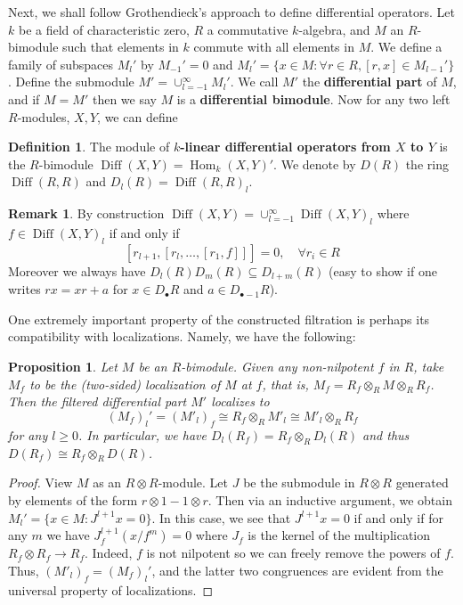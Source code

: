 \documentclass[11pt, a4paper]{article}
\newtheorem{proposition}[theorem]{Proposition}
\theoremstyle{definition}
\newtheorem{remark}[theorem]{Remark}
\newtheorem{definition}[theorem]{Definition}
\newcommand{\Hom}[0]{\operatorname{Hom}}
\newcommand{\Diff}{\operatorname{Diff}}
\begin{document}
    Next, we shall follow Grothendieck's approach to define differential operators. Let $k$ be a field of characteristic zero, $R$ a commutative $k$-algebra, and $M$ an $R$-bimodule such that elements in $k$ commute with all elements in $M$. We define a family of subspaces $M_l'$ by $M_{-1}'=0$ and $M_l'=\{x\in M: \forall r\in R, [r, x]\in M_{l-1}'\}$. Define the submodule $M'=\cup_{l=-1}^\infty M_l'$. We call $M'$ the \textbf{differential part} of $M$, and if $M=M'$ then we say $M$ is a \textbf{differential bimodule}. Now for any two left $R$-modules, $X, Y$, we can define
    \begin{definition}
        The module of \textbf{$k$-linear differential operators from $X$ to $Y$} is the $R$-bimodule $\Diff(X, Y)=\Hom_k(X, Y)'$. We denote by $D(R)$ the ring $\Diff(R, R)$ and $D_l(R)=\Diff(R, R)_l$.
    \end{definition}
    \begin{remark}
        By construction $\Diff(X, Y)=\cup_{l=-1}^\infty\Diff(X, Y)_l$ where $f\in\Diff(X, Y)_l$ if and only if 
        \[[r_{l+1},[r_l,\dots,[r_1, f]]]=0,\quad\forall r_i\in R\]
        Moreover we always have $D_l(R)D_m(R)\subseteq D_{l+m}(R)$ (easy to show if one writes $rx=xr+a$ for $x\in D_\bullet R$ and $a\in D_{\bullet-1}R$).
    \end{remark}
    One extremely important property of the constructed filtration is perhaps its compatibility with localizations. Namely, we have the following:
    \begin{proposition}\label{prop-loc}
        Let $M$ be an $R$-bimodule. Given any non-nilpotent $f$ in $R$, take $M_f$ to be the (two-sided) localization of $M$ at $f$, that is, $M_f=R_f\otimes_R M\otimes_R R_f$. Then the filtered differential part $M'$ localizes to
        \[(M_f)_l'=(M'_l)_f\cong R_f\otimes_R M'_l\cong M'_l\otimes_R R_f\]
        for any $l\geqslant 0$. In particular, we have $D_l(R_f)=R_f\otimes_R D_l(R)$ and thus $D(R_f)\cong R_f\otimes_R D(R)$.
    \end{proposition}
    \begin{proof}
        View $M$ as an $R\otimes R$-module. Let $J$ be the submodule in $R\otimes R$ generated by elements of the form $r\otimes 1-1\otimes r$. Then via an inductive argument, we obtain $M_l'=\{x\in M: J^{l+1}x=0\}$. In this case, we see that $J^{l+1}x=0$ if and only if for any $m$ we have $J_f^{l+1}(x/f^m)=0$ where $J_f$ is the kernel of the multiplication $R_f\otimes R_f\to R_f$. Indeed, $f$ is not nilpotent so we can freely remove the powers of $f$. Thus, $(M'_l)_f=(M_f)_l'$, and the latter two congruences are evident from the universal property of localizations.
    \end{proof}
\end{document}
